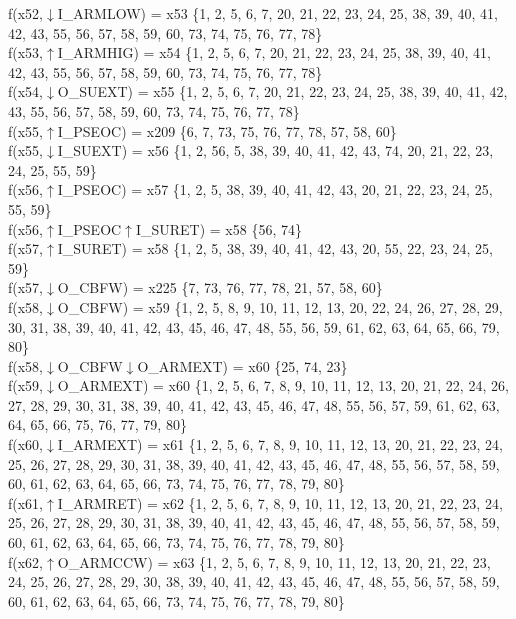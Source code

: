 f(x52,$\downarrow$I\_ARMLOW) = x53 \{1, 2, 5, 6, 7, 20, 21, 22, 23, 24, 25, 38, 39, 40, 41, 42, 43, 55, 56, 57, 58, 59, 60, 73, 74, 75, 76, 77, 78\} \\  
f(x53,$\uparrow$I\_ARMHIG) = x54 \{1, 2, 5, 6, 7, 20, 21, 22, 23, 24, 25, 38, 39, 40, 41, 42, 43, 55, 56, 57, 58, 59, 60, 73, 74, 75, 76, 77, 78\} \\  
f(x54,$\downarrow$O\_SUEXT) = x55 \{1, 2, 5, 6, 7, 20, 21, 22, 23, 24, 25, 38, 39, 40, 41, 42, 43, 55, 56, 57, 58, 59, 60, 73, 74, 75, 76, 77, 78\} \\  
f(x55,$\uparrow$I\_PSEOC) = x209 \{6, 7, 73, 75, 76, 77, 78, 57, 58, 60\} \\  
f(x55,$\downarrow$I\_SUEXT) = x56 \{1, 2, 56, 5, 38, 39, 40, 41, 42, 43, 74, 20, 21, 22, 23, 24, 25, 55, 59\} \\  
f(x56,$\uparrow$I\_PSEOC) = x57 \{1, 2, 5, 38, 39, 40, 41, 42, 43, 20, 21, 22, 23, 24, 25, 55, 59\} \\  
f(x56,$\uparrow$I\_PSEOC$\uparrow$I\_SURET) = x58 \{56, 74\} \\  
f(x57,$\uparrow$I\_SURET) = x58 \{1, 2, 5, 38, 39, 40, 41, 42, 43, 20, 55, 22, 23, 24, 25, 59\} \\  
f(x57,$\downarrow$O\_CBFW) = x225 \{7, 73, 76, 77, 78, 21, 57, 58, 60\} \\  
f(x58,$\downarrow$O\_CBFW) = x59 \{1, 2, 5, 8, 9, 10, 11, 12, 13, 20, 22, 24, 26, 27, 28, 29, 30, 31, 38, 39, 40, 41, 42, 43, 45, 46, 47, 48, 55, 56, 59, 61, 62, 63, 64, 65, 66, 79, 80\} \\  
f(x58,$\downarrow$O\_CBFW$\downarrow$O\_ARMEXT) = x60 \{25, 74, 23\} \\  
f(x59,$\downarrow$O\_ARMEXT) = x60 \{1, 2, 5, 6, 7, 8, 9, 10, 11, 12, 13, 20, 21, 22, 24, 26, 27, 28, 29, 30, 31, 38, 39, 40, 41, 42, 43, 45, 46, 47, 48, 55, 56, 57, 59, 61, 62, 63, 64, 65, 66, 75, 76, 77, 79, 80\} \\  
f(x60,$\downarrow$I\_ARMEXT) = x61 \{1, 2, 5, 6, 7, 8, 9, 10, 11, 12, 13, 20, 21, 22, 23, 24, 25, 26, 27, 28, 29, 30, 31, 38, 39, 40, 41, 42, 43, 45, 46, 47, 48, 55, 56, 57, 58, 59, 60, 61, 62, 63, 64, 65, 66, 73, 74, 75, 76, 77, 78, 79, 80\} \\  
f(x61,$\uparrow$I\_ARMRET) = x62 \{1, 2, 5, 6, 7, 8, 9, 10, 11, 12, 13, 20, 21, 22, 23, 24, 25, 26, 27, 28, 29, 30, 31, 38, 39, 40, 41, 42, 43, 45, 46, 47, 48, 55, 56, 57, 58, 59, 60, 61, 62, 63, 64, 65, 66, 73, 74, 75, 76, 77, 78, 79, 80\} \\  
f(x62,$\uparrow$O\_ARMCCW) = x63 \{1, 2, 5, 6, 7, 8, 9, 10, 11, 12, 13, 20, 21, 22, 23, 24, 25, 26, 27, 28, 29, 30, 38, 39, 40, 41, 42, 43, 45, 46, 47, 48, 55, 56, 57, 58, 59, 60, 61, 62, 63, 64, 65, 66, 73, 74, 75, 76, 77, 78, 79, 80\} \\  
